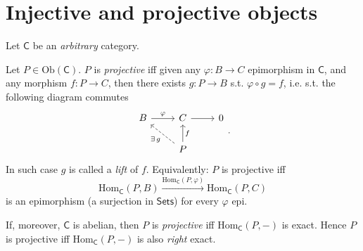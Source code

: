 \section{Injective and projective objects}
Let $\mathsf{C}$ be an {\em arbitrary} category.

\begin{defn}
	Let $P \in \mathrm{Ob} \left(\mathsf{C}\right)$.
	$P$ is {\em projective} iff given any $\varphi\colon B \to C$ epimorphism in $\mathsf{C}$, 
	and any morphism $f\colon P \to C$, then there exists $g\colon P \to B$ s.t. $\varphi \circ g = f$, 
	i.e. s.t. the following diagram commutes
	\begin{equation}
	\begin{tikzcd}
		B \arrow[r, "\varphi", rightarrow] &
		C \arrow[r, "", rightarrow] &
		0 \\
		&
		P \arrow[lu, "\exists\, g", dashrightarrow] \arrow[u, "f"', rightarrow]  &
	\end{tikzcd}
	.\end{equation} 
	In such case $g$ is called a {\em lift} of $f$.\newline
	Equivalently:
	$P$ is projective iff
	\begin{equation}
	\mathrm{Hom}_{\mathsf{C}} \left( P, B \right) \xrightarrow{\mathrm{Hom}_{\mathsf{C}} \left( P, \varphi \right)} 
	\mathrm{Hom}_{\mathsf{C}} \left( P, C \right)
	\end{equation} 
	is an epimorphism (a surjection in $\mathsf{Sets}$) for every $\varphi$ epi.
\end{defn}

\begin{rem}
	If, moreover, $\mathsf{C}$ is abelian, then
	$P$ is {\em projective} iff $\mathrm{Hom}_{\mathsf{C}} \left( P, - \right)$ is exact.
	Hence $P$ is projective iff $\mathrm{Hom}_{\mathsf{C}} \left( P, -\right)$ is also {\em right} exact.
\end{rem}

